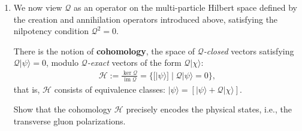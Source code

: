 \documentclass[10pt,a4paper]{article}
\theoremstyle{definition}
\begin{document}
{\begin{enumerate}
Consider the conserved charge
\begin{align}
\mathcal{Q}=\int d^3x\,j^0\tag{2}
\end{align}
and express it in terms of $A_\mu$ and $c$, using the equations of motion. Then writing $A_\mu$ and $c$ in terms of creation and annihilation operators satisfying the familiar algebra
\begin{align*}
A^\mu(x) &= \sum_{\lambda = >,<,+,-} \int \! dk \left[ \varepsilon^{\mu *}_\lambda(k) \, a_\lambda(k) \, e^{ikx} + \varepsilon^\mu_\lambda(k) \, a^\dagger_\lambda(k) \, e^{-ikx} \right]\\
c(x) &= \int \! dk \left[ c(k) \, e^{ikx} + c^\dagger(k) \, e^{-ikx} \right]
\end{align*}
Show that the adjoint action of $\mathcal{Q}$ on field operators reproduces the action of the BRST operator introduced in the lecture.

\item We now view $\mathcal{Q}$ as an operator on the multi-particle Hilbert space defined by the creation and annihilation operators introduced above, satisfying the nilpotency condition $\mathcal{Q}^2 = 0$.

There is the notion of \textbf{cohomology}, the space of \emph{$\mathcal{Q}$-closed} vectors satisfying $\mathcal{Q}|\psi\rangle = 0$, modulo \emph{$\mathcal{Q}$-exact} vectors of the form \( \mathcal{Q}|\chi\rangle \):
\begin{align*}
\mathcal{H} := \frac{\ker \mathcal{Q}}{\operatorname{im} \mathcal{Q}} = \{ [|\psi\rangle] \;|\; \mathcal{Q}|\psi\rangle = 0 \},
\end{align*}
that is, $\mathcal{H}$ consists of equivalence classes:
$|\psi\rangle = \left[|\psi\rangle + \mathcal{Q}|\chi\rangle\right]$.

Show that the cohomology $\mathcal{H}$ precisely encodes the physical states, i.e., the transverse gluon polarizations.
\end{enumerate}
}
\end{document}
